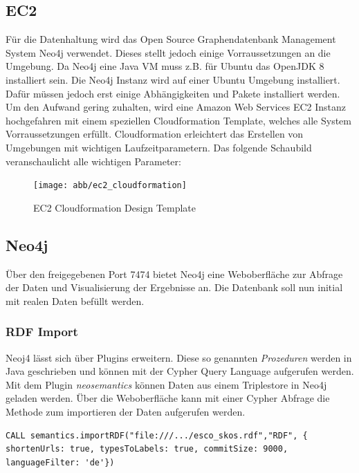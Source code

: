 \subsection{EC2 }
Für die Datenhaltung wird das Open Source Graphendatenbank Management System Neo4j verwendet. Dieses stellt jedoch einige Vorraussetzungen an die Umgebung\cite{neo4jsysreq}. Da Neo4j eine Java VM muss z.B. für Ubuntu das OpenJDK 8 installiert sein.
Die Neo4j Instanz wird auf einer Ubuntu Umgebung installiert. Dafür müssen jedoch erst einige Abhängigkeiten und Pakete installiert werden. Um den Aufwand gering zuhalten, wird eine Amazon Web Services EC2 Instanz hochgefahren mit einem speziellen Cloudformation Template, welches alle System Vorraussetzungen erfüllt. Cloudformation erleichtert das Erstellen von Umgebungen mit wichtigen Laufzeitparametern. Das folgende Schaubild veranschaulicht alle wichtigen Parameter:

\begin{figure}[htb]
 \centering
 \texttt{[image: abb/ec2\_cloudformation]}
 \caption[Beschreibung]{EC2 Cloudformation Design Template}
\label{fig:EC2 Cloudformation Template}
\end{figure}

\pagebreak

\subsection{Neo4j}

Über den freigegebenen Port 7474 bietet Neo4j eine Weboberfläche zur Abfrage der Daten und Visualisierung der Ergebnisse an. Die Datenbank soll nun initial mit realen Daten befüllt werden. 

\subsubsection{RDF Import}

Neoj4 lässt sich über Plugins erweitern. Diese so genannten \textit{Prozeduren} werden in Java geschrieben und können mit der Cypher Query Language aufgerufen werden.
Mit dem Plugin \textit{neosemantics} können Daten aus einem Triplestore in Neo4j geladen werden. Über die Weboberfläche kann mit einer Cypher Abfrage die Methode zum importieren der Daten aufgerufen werden. \newline

\lstset{language=xml}
\lstset{language=java}
\lstset{breaklines=true}
\begin{lstlisting}[frame=htrbl, caption={importRDF Prozeduraufruf}, label={lst:importRDF}]
CALL semantics.importRDF("file:///.../esco_skos.rdf","RDF", { shortenUrls: true, typesToLabels: true, commitSize: 9000, languageFilter: 'de'})


\end{lstlisting}




